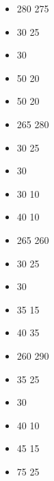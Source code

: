 \begin{multicols}{2}
\begin{itemize}
		\item \basecost{} 280 \costdown{} 275
		\item \bigbrother{} 30 \costdown{} 25
		\item \giantclub{} 30 \costdown{} \free
		\item \bonechariot{} 50 \costdown{} 20
		\item \scarabgiant{} 50 \costdown{} 20
		\subsubtitle{\corpsegiant}
		\item \basecost{} 265 \costup{} 280
		\item \bigbrother{} 30 \costdown{} 25
		\item \barrowgiant{} 30 \costdown{} \free
		\item \ghoulgiant{} 30 \costdown{} 10
		\item \zombiegiant{} 40 \costdown{} 10
		\subsubtitle{\verminousgiant}
		\item \basecost{} 265 \costdown{} 260
		\item \bigbrother{} 30 \costdown{} 25
		\item \giantclub{} 30 \costdown{} \free
		\item \livingbomb{} 35 \costdown{} 15
		\item \bigsneaker{} 40 \costdown{} 35
		\subsubtitle{\maraudinggiant}
		\item \basecost{} 260 \costup{} 290
		\item \bigbrother{} 35 \costdown{} 25
		\item \giantclub{} 30 \costdown{} \free
		\item \tribalwarspear{} 40 \costdown{} 10
		\item \monstrousfamiliar{} 45 \costdown{} 15
		\item \favouredgiant{} 75 \costdown{} 25
			\end{itemize}
	\end{multicols}